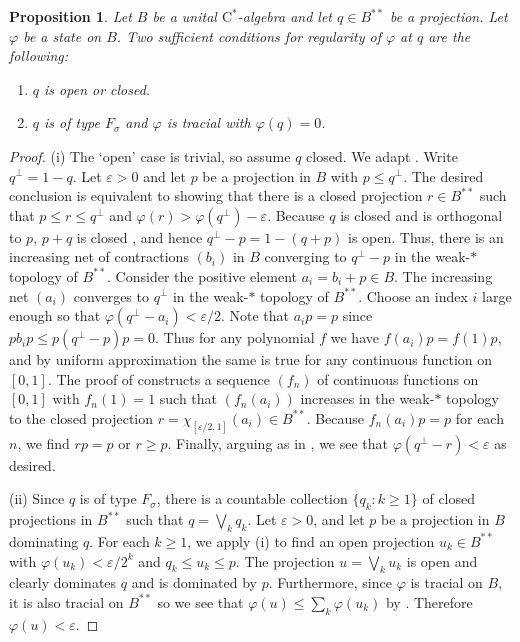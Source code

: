 \documentclass[10pt]{amsart}
\newcommand{\rC}{\mathrm{C}}
\newcommand{\eps}{\varepsilon}
\renewcommand{\phi}{\varphi}
\newtheorem{proposition}[lemma]{Proposition}
\theoremstyle{definition}
\begin{document}
\begin{proposition} \label{P:stateapproxopen} 
Let $B$ be a unital $\rC^*$-algebra and let $q\in B^{**}$ be a projection. Let $\phi$ be a state on $B$.
Two sufficient  conditions for  regularity of $\phi$  at $q$ are the following: 
\begin{enumerate}[{\rm (i)}]
\item $q$ is open or closed.
\item $q$ is of type $F_\sigma$ and $\phi$ is tracial with $\phi(q) = 0$.
\end{enumerate}
\end{proposition}
\begin{proof}
(i)  The `open' case is trivial, so assume $q$ closed. We adapt
 \cite[Proposition II.3]{akemann1969}.  Write $q^\perp=1-q$. Let $\eps>0$ and let $p$ be a projection in $B$ with $p \leq q^\perp$. The desired conclusion is equivalent to showing that there is a closed projection $r\in B^{**}$ such that $p\leq r\leq q^\perp$ and $\phi(r)>\phi(q^\perp)-\eps$.  Because $q$ is closed and is orthogonal to $p$, $p+q$ is closed \cite[Theorem II.7]{akemann1969}, and hence $q^\perp - p=1-(q+p)$ is open. Thus, there is an increasing net of contractions $(b_i)$ in $B$ converging to $q^\perp - p$ in the weak-$*$ topology of $B^{**}$. Consider the positive element $a_i = b_i + p\in B$. The increasing net $(a_i)$ converges to $q^\perp$ in the weak-$*$ topology of $B^{**}$. Choose an index $i$ large enough so that $\phi(q^\perp-a_i)<\eps/2$. Note that $a_i p = p$ since $p b_i p \leq p (q^\perp - p) p = 0$.  Thus for any polynomial $f$ we have $f(a_i) p = f(1) p$, and by uniform approximation the same is true for any continuous function on $[0,1]$. The proof of  \cite[Proposition II.3]{akemann1969} constructs a sequence $(f_n)$ of continuous functions on $[0,1]$ with $f_n(1)=1$ such that $(f_n(a_i))$ increases in the weak-$*$ topology to the closed projection $r=\chi_{[\eps/2,1]}(a_i)\in B^{**}$. Because $f_n(a_i)p=p$ for each $n$, we find $rp=p$ or $r\geq p$. Finally, arguing as in  \cite[Proposition II.3]{akemann1969}, we see that $\phi(q^\perp-r)<\eps$ as desired.
  

(ii) Since $q$ is of type $F_\sigma$, there is a countable collection $\{q_k:k\geq 1\}$ of closed projections in $B^{**}$ such that $q=\bigvee_{k} q_k$. Let $\eps>0$, and 
 let $p$ be a projection in $B$ dominating $q$. For each $k\geq 1$, we apply (i) to find an open projection $u_k\in B^{**}$ 
 with $\phi(u_k) <\eps/2^k$ and $q_k \leq u_k \leq p$. The projection $u=\bigvee_k u_k$ is open and clearly dominates $q$
 and is dominated by $p$. Furthermore, since $\phi$ is tracial on $B$, it is also tracial on $B^{**}$ so we see that $ \phi(u)\leq\sum_{k} \phi(u_k)$ by \cite[Proposition V.1.6]{takesaki2002}. Therefore $\phi(u)<\eps$.
\end{proof}
\end{document}
